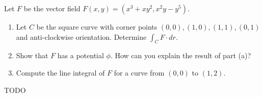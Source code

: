 \begin{exercise}
	Let $F$ be the vector field $F(x,y) = (x^3 + xy^2, x^2 y - y^5)$.
	\begin{enumerate}
		\item Let $C$ be the square curve with corner points $(0,0), (1,0), (1,1), (0,1)$ and anti-clockwise orientation. Determine $\int_C F \cdot dr$.

		\item Show that $F$ has a potential $\phi$. How can you explain the result of part (a)?

		\item Compute the line integral of $F$ for a curve from $(0,0)$ to $(1,2)$.
	\end{enumerate}
\end{exercise}

\begin{solution}
	TODO
\end{solution}
